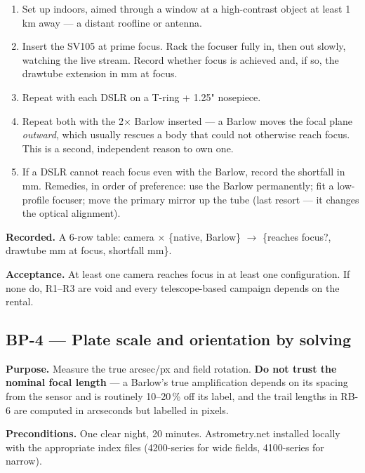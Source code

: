 \documentclass[11pt]{article}
\begin{document}
\begin{enumerate}
\item Set up indoors, aimed through a window at a high-contrast object at least
      1\,km away --- a distant roofline or antenna.
\item Insert the SV105 at prime focus. Rack the focuser fully in, then out
      slowly, watching the live stream. Record whether focus is achieved and,
      if so, the drawtube extension in mm at focus.
\item Repeat with each DSLR on a T-ring + 1.25" nosepiece.
\item Repeat both with the 2$\times$ Barlow inserted --- a Barlow moves the
      focal plane \emph{outward}, which usually rescues a body that could not
      otherwise reach focus. This is a second, independent reason to own one.
\item If a DSLR cannot reach focus even with the Barlow, record the shortfall in
      mm. Remedies, in order of preference: use the Barlow permanently; fit a
      low-profile focuser; move the primary mirror up the tube (last resort ---
      it changes the optical alignment).
\end{enumerate}

\textbf{Recorded.} A 6-row table: camera $\times$ \{native, Barlow\}
$\rightarrow$ \{reaches focus?, drawtube mm at focus, shortfall mm\}.

\textbf{Acceptance.} At least one camera reaches focus in at least one
configuration. If none do, R1--R3 are void and every telescope-based campaign
depends on the rental.

\subsection*{BP-4 --- Plate scale and orientation by solving}

\textbf{Purpose.} Measure the true arcsec/px and field rotation. \textbf{Do not
trust the nominal focal length} --- a Barlow's true amplification depends on its
spacing from the sensor and is routinely 10--20\,\% off its label, and the trail
lengths in RB-6 are computed in arcseconds but labelled in pixels.

\textbf{Preconditions.} One clear night, 20 minutes. Astrometry.net installed
locally with the appropriate index files (4200-series for wide fields,
4100-series for narrow).
\end{document}
